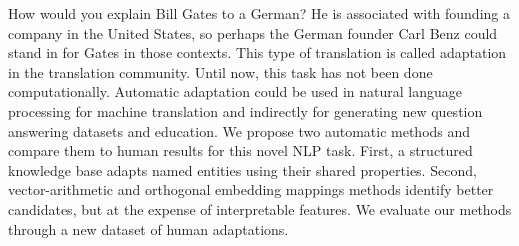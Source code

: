 How would you explain Bill Gates to a German? He is associated with founding a company in the United States, so perhaps the German founder Carl Benz could stand in for Gates in those contexts.  This type of translation is called adaptation in the translation community.    Until now, this task has not been done computationally. Automatic adaptation could be used in natural language processing for machine translation and indirectly for generating new question answering datasets and education.  We propose two automatic methods and compare them to human results for this novel NLP task.   First, a structured knowledge base adapts named entities using their shared properties. Second, vector-arithmetic and orthogonal embedding mappings methods identify better candidates, but at the expense of interpretable features. We evaluate our methods through a new dataset of human adaptations.
